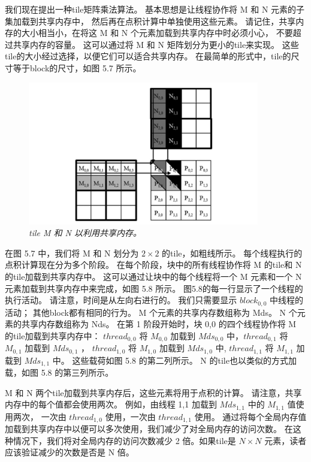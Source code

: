 我们现在提出一种tile矩阵乘法算法。 基本思想是让线程协作将 M 和 N 元素的子集加载到共享内存中，
然后再在点积计算中单独使用这些元素。 请记住，共享内存的大小相当小，在将这 M 和 N 个元素加载到共享内存中时必须小心，
不要超过共享内存的容量。 这可以通过将 M 和 N 矩阵划分为更小的tile来实现。 
这些tile的大小经过选择，以便它们可以适合共享内存。 在最简单的形式中，tile的尺寸等于block的尺寸，如图 5.7 所示。

\begin{figure}[H]
	\centering
	\includegraphics[width=0.9\textwidth]{figs/F5.7.png}
	\caption{\textit{tile M 和 N 以利用共享内存。}}
\end{figure}

在图 5.7 中，我们将 M 和 N 划分为 $2 \times 2$ 的tile，如粗线所示。 每个线程执行的点积计算现在分为多个阶段。 
在每个阶段，块中的所有线程协作将 M 的tile和 N 的tile加载到共享内存中。 
这可以通过让块中的每个线程将一个 M 元素和一个 N 元素加载到共享内存中来完成，如图 5.8 所示。 
图5.8的每一行显示了一个线程的执行活动。 请注意，时间是从左向右进行的。 
我们只需要显示 $block_{0,0}$ 中线程的活动； 其他block都有相同的行为。 M 个元素的共享内存数组称为 Mds。 
N 个元素的共享内存数组称为 Nds。 在第 1 阶段开始时，块 0,0 的四个线程协作将 M 的tile加载到共享内存中：
$thread_{0,0}$ 将 $M_{0,0}$ 加载到 $Mds_{0,0}$ 中，$thread_{0,1}$ 将 $M_{0,1}$ 加载到 $Mds_{0,1}$ ，
$thread_{1,0}$ 将 $M_{1,0}$ 加载到 $Mds_{1,0}$ 中, $thread_{1,1}$ 将 $M_{1,1}$ 加载到 $Mds_{1,1}$ 中。 
这些载荷如图 5.8 的第二列所示。 N 的tile也以类似的方式加载，如图 5.8 的第三列所示。

M 和 N 两个tile加载到共享内存后，这些元素将用于点积的计算。 请注意，共享内存中的每个值都会使用两次。 
例如，由线程 1,1 加载到 $Mds_{1,1}$ 中的 $M_{1,1}$ 值使用两次，
一次由 $thread_{1,0}$ 使用，一次由 $thread_{1,1}$ 使用。 
通过将每个全局内存值加载到共享内存中以便可以多次使用，我们减少了对全局内存的访问次数。 
在这种情况下，我们将对全局内存的访问次数减少 2 倍。如果tile是 $N \times N$ 元素，读者应该验证减少的次数是否是 N 倍。

